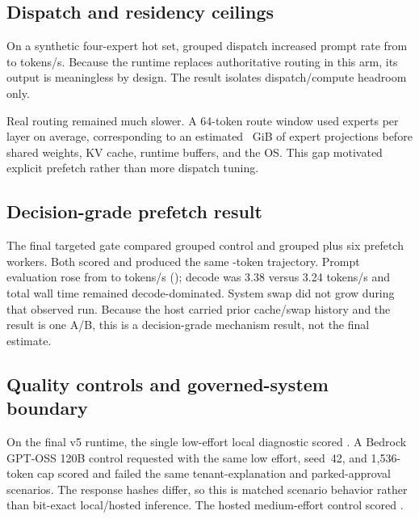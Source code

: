\documentclass[10pt,twocolumn]{article}
\begin{document}
\subsection{Dispatch and residency ceilings}

On a synthetic four-expert hot set, grouped dispatch increased prompt rate
from \CurrentHotUngroupedRate{} to \CurrentHotGroupedRate{} tokens/s.  Because
the runtime replaces authoritative routing in this arm, its output is
meaningless by design.  The result isolates dispatch/compute headroom only.

Real routing remained much slower.  A 64-token route window used
\CurrentRouteWindowExperts{} experts per layer on average, corresponding to an
estimated \CurrentRouteWindowGiB{}~GiB of expert projections before shared
weights, KV cache, runtime buffers, and the OS.  This gap motivated explicit
prefetch rather than more dispatch tuning.

\subsection{Decision-grade prefetch result}

The final targeted gate compared grouped control and grouped plus six prefetch
workers.  Both scored \CurrentTargetedScore{} and produced the same
\CurrentTrajectoryTokens-token trajectory.  Prompt evaluation rose from
\CurrentPrefetchControlRate{} to \CurrentPrefetchRate{} tokens/s
(\CurrentPrefetchGain); decode was 3.38 versus 3.24 tokens/s and total wall
time remained decode-dominated.  System swap did not grow during that observed
run.  Because the host carried prior cache/swap history and the result is one
A/B, this is a decision-grade mechanism result, not the final estimate.

\subsection{Quality controls and governed-system boundary}

On the final v5 runtime, the single low-effort local diagnostic scored
\CurrentLocalLowQuality{}.  A Bedrock GPT-OSS 120B control requested with the
same low effort, seed~42, and 1,536-token cap scored
\CurrentHostedLowQuality{} and failed the same tenant-explanation and
parked-approval scenarios.  The response hashes differ, so this is matched
scenario behavior rather than bit-exact local/hosted inference.  The hosted
medium-effort control scored \CurrentHostedMediumQuality{}.
\end{document}
